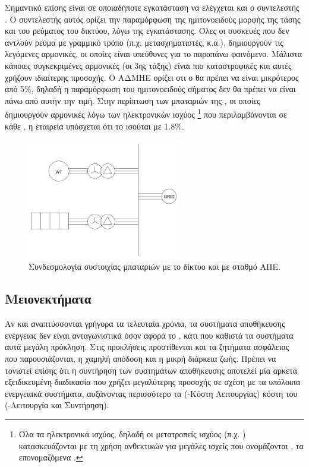 \documentclass[12pt]{report}
\begin{document}
Σημαντικό επίσης είναι σε οποιαδήποτε εγκατάσταση να ελέγχεται και ο συντελεστής {}. Ο συντελεστής αυτός ορίζει την παραμόρφωση της ημιτονοειδούς μορφής της τάσης και του ρεύματος του
δικτύου, λόγω της εγκατάστασης. Όλες οι συσκευές που δεν αντλούν ρεύμα με γραμμικό τρόπο (π.χ. μετασχηματιστές, {} κ.α.), δημιουργούν τις λεγόμενες αρμονικές, οι οποίες είναι υπεύθυνες για το παραπάνω
φαινόμενο. Μάλιστα κάποιες συγκεκριμένες αρμονικές (οι 3ης τάξης) είναι πιο καταστροφικές και αυτές χρήζουν ιδιαίτερης προσοχής. Ο ΑΔΜΗΕ ορίζει οτι ο {} θα πρέπει να είναι μικρότερος από 5\%, δηλαδή η παραμόρφωση
του ημιτονοειδούς σήματος δεν θα πρέπει να είναι πάνω από αυτήν την τιμή. Στην περίπτωση των μπαταριών της {}, οι οποίες δημιουργούν αρμονικές λόγω των ηλεκτρονικών ισχύος
\footnote{Όλα τα ηλεκτρονικά ισχύος, δηλαδή οι μετατροπείς ισχύος (π.χ. {}) κατασκευάζονται με τη χρήση ανθεκτικών για μεγάλες ισχείς {} που ονομάζονται {}, 
τα επονομαζόμενα {}.} που περιλαμβάνονται σε κάθε {}, η εταιρεία υπόσχεται ότι το {} ισούται με 1.8\%.

\begin{figure}[h]
				\center
				\includegraphics[width=0.6\textwidth]{gridbat}
				\captionsetup{width=0.8\textwidth}
				\caption{Συνδεσμολογία συστοιχίας μπαταριών με το δίκτυο και με σταθμό ΑΠΕ.}
				\label{fig:gridbat}
\end{figure}

\subsection{Μειονεκτήματα}
Αν και αναπτύσσονται γρήγορα τα τελευταία χρόνια, τα συστήματα αποθήκευσης ενέργειας δεν είναι ανταγωνιστικά όσον αφορά το
{}, κάτι που καθιστά τα συστήματα αυτά μεγάλη πρόκληση. Στις προκλήσεις προστίθενται και τα
ζητήματα ασφάλειας που παρουσιάζονται, η χαμηλή απόδοση και η μικρή διάρκεια ζωής. Πρέπει να τονιστεί επίσης ότι η συντήρηση των
συστημάτων αποθήκευσης αποτελεί μία αρκετά εξειδικευμένη διαδικασία που χρήζει μεγαλύτερης προσοχής σε σχέση με τα υπόλοιπα ενεργειακά συστήματα,
αυξάνοντας περισσότερο τα {} ({}-Κόστη Λειτουργίας) κόστη του {} ({}-Λειτουργία και Συντήρηση).
\end{document}

